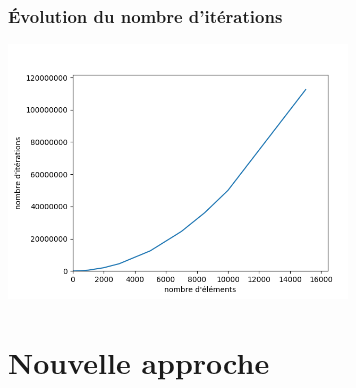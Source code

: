 \documentclass[svgnames,11pt]{beamer}
\begin{document}
\begin{frame}
    \frametitle{Évolution du nombre d'itérations}

    \begin{center}
        \includegraphics[width=9cm]{ressources/complexite-selection.png}
    \end{center}
\end{frame}
\section{Nouvelle approche}
\end{document}
